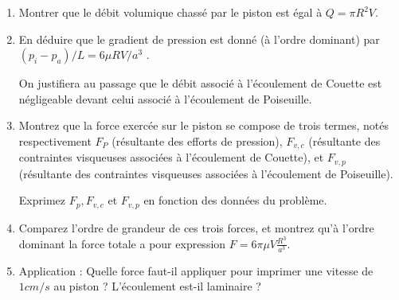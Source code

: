 \begin{enumerate}

\item Montrer que le débit volumique chassé par le piston est égal à $Q = \pi R^2 V$.



\item En déduire que le gradient de pression est donné (à l'ordre dominant) par 
$(p_i-p_a)/L = 6 \mu R V/a^3$ .

On justifiera au passage que le débit associé à l'écoulement de Couette est négligeable devant celui associé à l'écoulement de Poiseuille.






\item  Montrez que la force exercée sur le piston se compose de trois termes, notés respectivement $F_P$ (résultante des efforts de pression), $F_{v,c}$ (résultante des contraintes visqueuses associées à l'écoulement de Couette), et $F_{v,p}$ (résultante des contraintes visqueuses associées à l'écoulement de Poiseuille).

Exprimez $F_p, F_{v,c}$ et $F_{v,p}$ en fonction des données du problème.


\item Comparez l'ordre de grandeur de ces trois forces, et montrez qu'à l'ordre dominant la force totale a pour expression $F = 6 \pi \mu V \frac{R^3}{a^3}$.


\item Application : Quelle force faut-il appliquer pour imprimer une vitesse de $1cm/s$ au piston ? L’écoulement est-il laminaire ? 




\end{enumerate}



